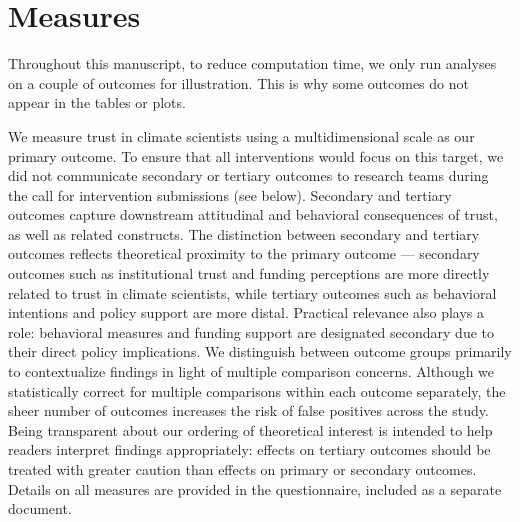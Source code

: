 \documentclass[
  letterpaper,
  DIV=11,
  numbers=noendperiod]{scrartcl}
\begin{document}
\section{Measures}\label{measures}

\begin{tcolorbox}[enhanced jigsaw, rightrule=.15mm, colback=white, left=2mm, coltitle=black, breakable, toprule=.15mm, bottomtitle=1mm, titlerule=0mm, title=\textcolor{quarto-callout-note-color}{\faInfo}\hspace{0.5em}{Note}, arc=.35mm, toptitle=1mm, colbacktitle=quarto-callout-note-color!10!white, bottomrule=.15mm, opacityback=0, opacitybacktitle=0.6, colframe=quarto-callout-note-color-frame, leftrule=.75mm]

Throughout this manuscript, to reduce computation time, we only run
analyses on a couple of outcomes for illustration. This is why some
outcomes do not appear in the tables or plots.

\end{tcolorbox}

We measure trust in climate scientists using a multidimensional scale as
our primary outcome. To ensure that all interventions would focus on
this target, we did not communicate secondary or tertiary outcomes to
research teams during the call for intervention submissions (see below).
Secondary and tertiary outcomes capture downstream attitudinal and
behavioral consequences of trust, as well as related constructs. The
distinction between secondary and tertiary outcomes reflects theoretical
proximity to the primary outcome --- secondary outcomes such as
institutional trust and funding perceptions are more directly related to
trust in climate scientists, while tertiary outcomes such as behavioral
intentions and policy support are more distal. Practical relevance also
plays a role: behavioral measures and funding support are designated
secondary due to their direct policy implications. We distinguish
between outcome groups primarily to contextualize findings in light of
multiple comparison concerns. Although we statistically correct for
multiple comparisons within each outcome separately, the sheer number of
outcomes increases the risk of false positives across the study. Being
transparent about our ordering of theoretical interest is intended to
help readers interpret findings appropriately: effects on tertiary
outcomes should be treated with greater caution than effects on primary
or secondary outcomes. Details on all measures are provided in the
questionnaire, included as a separate document.
\end{document}
